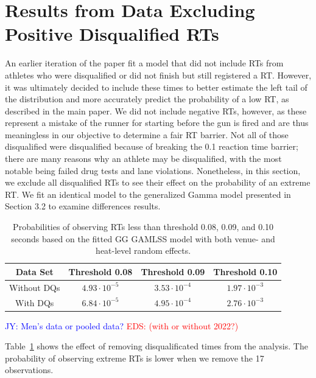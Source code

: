\documentclass[12pt, letterpaper]{article}
\newcommand{\jy}[1]{\textcolor{blue}{JY: #1}}
\newcommand{\eds}[1]{\textcolor{red}{EDS: (#1)}}
\begin{document}
\section{Results from Data Excluding Positive Disqualified RTs}

An earlier iteration of the paper fit a model that did not include RTs from
athletes who were disqualified or did not finish but still registered a RT.  
However, it was ultimately decided to include these times to better estimate the 
left tail of the distribution and more accurately predict the probability of a 
low RT, as described in the main paper.  
We did not include negative RTs, however, as these represent a mistake 
of the runner for starting before
the gun is fired and are thus meaningless in our objective to
determine a fair RT barrier.  Not all of those disqualified were
disqualified because of breaking the 0.1 reaction time barrier; there are many
reasons why an athlete may be disqualified, with the most notable being failed
drug tests and lane violations.  Nonetheless, in this section,
we exclude all disqualified RTs to see their effect on the probability of an
extreme RT.  We fit an identical model to the generalized Gamma model
presented in Section 3.2 to examine differences results.

\begin{table}
  \centering
  \caption{Probabilities of observing RTs less than threshold 0.08,
  0.09, and 0.10 seconds based on the
    fitted GG GAMLSS model with both venue- and heat-level
random effects.}
  \begin{tabular}{c c c c}
   \toprule
   Data Set & Threshold 0.08 & Threshold 0.09 & Threshold 0.10  \\
   \midrule
   Without DQs & $4.93\cdot10^{-5}$ & $3.53\cdot10^{-4}$ &  $1.97\cdot10^{-3}$  \\
   With DQs & $6.84\cdot10^{-5}$ & $4.95\cdot10^{-4}$ & $2.76\cdot10^{-3}$ \\
   \bottomrule
  \end{tabular}
  \label{tab:DQSim_probability}
\end{table}

\jy{Men's data or pooled data?}
\eds{with or without 2022?}

Table~\ref{tab:DQSim_probability} shows the effect of removing disqualificated
times from the analysis.  The probability of observing extreme RTs is lower when
we remove the 17 observations.



\end{document}
